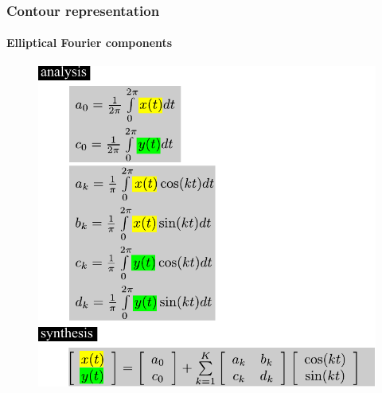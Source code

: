 \begin{frame}
\frametitle{Contour representation}
\framesubtitle{Elliptical Fourier components}
\logoCSIPCPL\mypagenum
	\begin{figure}
		\includegraphics[height=0.8\textheight]{figs/theory_curves_ellipticalFourier.pdf}
	\end{figure}
\end{frame}


